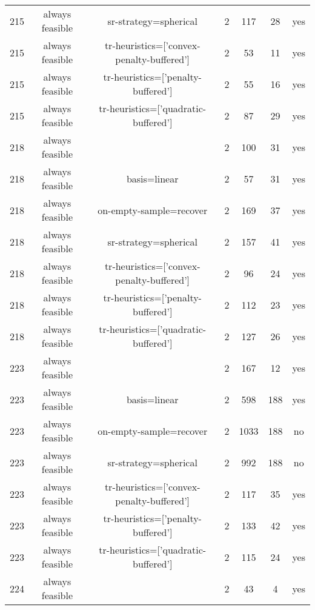\begin{scriptsize}
\begin{center}
\begin{longtable}{ccccccc}
215 & always feasible &                     sr-strategy=spherical & 2 &    117 &     28 &     yes\\
215 & always feasible & tr-heuristics=['convex-penalty-buffered'] & 2 &     53 &     11 &     yes\\
215 & always feasible &        tr-heuristics=['penalty-buffered'] & 2 &     55 &     16 &     yes\\
215 & always feasible &      tr-heuristics=['quadratic-buffered'] & 2 &     87 &     29 &     yes\\
218 & always feasible &                                           & 2 &    100 &     31 &     yes\\
218 & always feasible &                              basis=linear & 2 &     57 &     31 &     yes\\
218 & always feasible &                   on-empty-sample=recover & 2 &    169 &     37 &     yes\\
218 & always feasible &                     sr-strategy=spherical & 2 &    157 &     41 &     yes\\
218 & always feasible & tr-heuristics=['convex-penalty-buffered'] & 2 &     96 &     24 &     yes\\
218 & always feasible &        tr-heuristics=['penalty-buffered'] & 2 &    112 &     23 &     yes\\
218 & always feasible &      tr-heuristics=['quadratic-buffered'] & 2 &    127 &     26 &     yes\\
223 & always feasible &                                           & 2 &    167 &     12 &     yes\\
223 & always feasible &                              basis=linear & 2 &    598 &    188 &     yes\\
223 & always feasible &                   on-empty-sample=recover & 2 &   1033 &    188 &      no\\
223 & always feasible &                     sr-strategy=spherical & 2 &    992 &    188 &      no\\
223 & always feasible & tr-heuristics=['convex-penalty-buffered'] & 2 &    117 &     35 &     yes\\
223 & always feasible &        tr-heuristics=['penalty-buffered'] & 2 &    133 &     42 &     yes\\
223 & always feasible &      tr-heuristics=['quadratic-buffered'] & 2 &    115 &     24 &     yes\\
224 & always feasible &                                           & 2 &     43 &      4 &     yes\\

\end{longtable}
\end{center}
\end{scriptsize}
